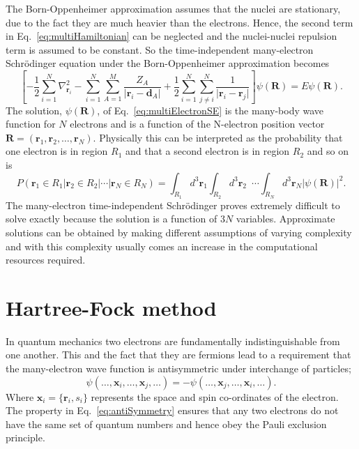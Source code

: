 The Born-Oppenheimer approximation \cite{Born1927} assumes that the nuclei are stationary, due to the fact they are much heavier than the electrons. Hence, the second term in Eq.~\ref{eq:multiHamiltonian} can be neglected and the nuclei-nuclei repulsion term is assumed to be constant. So the time-independent many-electron Schr\"{o}dinger equation under the Born-Oppenheimer approximation becomes
\begin{equation}
\label{eq:multiElectronSE}
\left[
-\frac{1}{2}\sum_{i=1}^N \nabla_{\textbf{r}_i}^2
-\sum_{i=1}^N \sum_{A=1}^M \frac{Z_A}{\lvert \textbf{r}_i-\textbf{d}_A\rvert}
+\frac{1}{2}\sum_{i=1}^N \sum_{j\neq i}^N \frac{1}{\lvert \textbf{r}_i-\textbf{r}_j\rvert} \right]
\psi(\textbf{R}) = E\psi(\textbf{R}).
\end{equation}
The solution, $\psi(\textbf{R})$, of Eq.~\ref{eq:multiElectronSE} is the many-body wave function for $N$ electrons and is a function of the N-electron position vector $\textbf{R} = (\textbf{r}_1, \textbf{r}_2, \dotsc, \textbf{r}_N)$. Physically this can be interpreted as the probability that one electron is in region $R_1$ and that a second electron is in region $R_2$ and so on is
\begin{equation}
\label{eq:manyElectronProbability}
P(\textbf{r}_1 \in R_1 \vert \textbf{r}_2 \in R_2 \vert \dotsb \vert \textbf{r}_N \in R_N) =
\int_{R_1}d^3\textbf{r}_1\int_{R_2}d^3\textbf{r}_2\phantom{0}\dotsi \int_{R_N}d^3\textbf{r}_N\lvert\psi(\textbf{R})\rvert^2.
\end{equation}
The many-electron time-independent Schr\"{o}dinger proves extremely difficult to solve exactly because the solution is a function of $3N$ variables. Approximate solutions can be obtained by making different assumptions of varying complexity and with this complexity usually comes an increase in the computational resources required. 

\section*{Hartree-Fock method}
In quantum mechanics two electrons are fundamentally indistinguishable from one another. This and the fact that they are fermions lead to a requirement that the many-electron wave function is antisymmetric under interchange of particles;
\begin{equation}
\label{eq:antiSymmetry}
\psi(\dotsc,\textbf{x}_i,\dotsc,\textbf{x}_j,\dotsc) = - \psi(\dotsc,\textbf{x}_j,\dotsc,\textbf{x}_i,\dotsc).
\end{equation}
Where $\textbf{x}_i = \{ \textbf{r}_i, s_i\}$ represents the space and spin co-ordinates of the electron. The property in Eq.~\ref{eq:antiSymmetry} ensures that any two electrons do not have the same set of quantum numbers and hence obey the Pauli exclusion principle\cite{Foulkes2001}.


